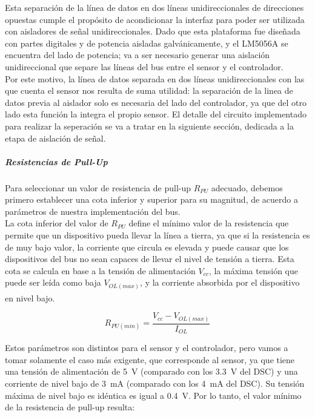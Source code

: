Esta separación de la línea de datos en dos líneas unidireccionales de direcciones opuestas cumple el propósito de acondicionar la interfaz para poder ser utilizada con aisladores de señal unidireccionales. Dado que esta plataforma fue diseñada con partes digitales y de potencia aisladas galvánicamente, y el LM5056A se encuentra del lado de potencia; va a ser necesario generar una aislación unidireccional que separe las líneas del bus entre el sensor y el controlador.\\

Por este motivo, la línea de datos separada en dos líneas unidireccionales con las que cuenta el sensor nos resulta de suma utilidad: la separación de la linea de datos previa al aislador solo es necesaria del lado del controlador, ya que del otro lado esta función la integra el propio sensor. El detalle del circuito implementado para realizar la seperación se va a tratar en la siguiente sección, dedicada a la etapa de aislación de señal.\\

\subparagraph{Resistencias de Pull-Up}

Para seleccionar un valor de resistencia de pull-up $R_{PU}$ adecuado, debemos primero establecer una cota inferior y superior para su magnitud, de acuerdo a parámetros de nuestra implementación del bus.\\

La {\Medium cota inferior} del valor de $R_{PU}$ define el mínimo valor de la resistencia que permite que un dispositivo pueda llevar la línea a tierra, ya que si la resistencia es de muy bajo valor, la corriente que circula es elevada y puede causar que los dispositivos del bus no sean capaces de llevar el nivel de tensión a tierra. Esta cota se calcula en base a la tensión de alimentación $V_{cc}$, la máxima tensión que puede ser leída como baja $V_{OL(max)}$, y la corriente absorbida por el dispositivo en nivel bajo.\textsuperscript{\cite{I2C-PullUp}}

\begin{equation}\label{Rpu_min}
    R_{PU(min)} = \frac{V_{cc}-V_{OL(max)}}{I_{OL}}
\end{equation}

Estos parámetros son distintos para el sensor y el controlador, pero vamos a tomar solamente el caso más exigente, que corresponde al sensor, ya que tiene una tensión de alimentación de \SI[]{5}{\volt} (comparado con los \SI[]{3.3}{\volt} del DSC) y una corriente de nivel bajo de \SI[]{3}{\milli\ampere} (comparado con los \SI[]{4}{\milli\ampere} del DSC). Su tensión máxima de nivel bajo es idéntica es igual a \SI[]{0.4}{\volt}. Por lo tanto, el valor mínimo de la resistencia de pull-up resulta:

